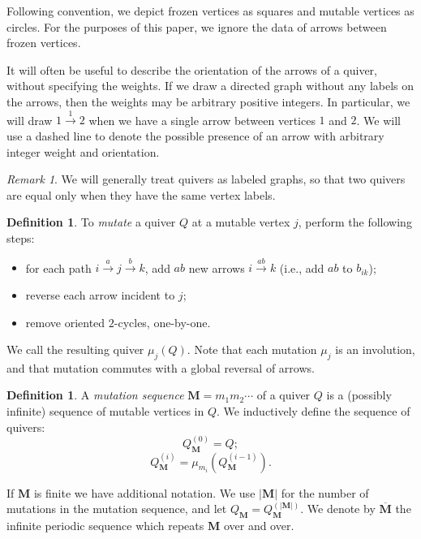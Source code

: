 \documentclass[12pt]{amsart}
\theoremstyle{definition}
\newtheorem{defn}[thm]{Definition}
\newtheorem{definition}[thm]{Definition}
\theoremstyle{remark}
\newtheorem{rem}[thm]{Remark}
\numberwithin{equation}{section}
\begin{document}
Following convention, we depict frozen vertices as squares and mutable vertices as circles.  For the purposes of this paper, we ignore the data of arrows between frozen vertices.

It will often be useful to describe the orientation of the arrows of a quiver, without specifying the weights.  If we draw a directed graph without any labels on the arrows, then the weights may be arbitrary positive integers.
In particular, we will draw $1 \stackrel{1}{\rightarrow} 2$ when we have a single arrow between vertices $1$ and $2$. 
We will use a dashed line to denote the possible presence of an arrow with arbitrary integer weight and orientation. 

\begin{rem}
We will generally treat quivers as labeled graphs, so that two quivers are equal only when they have the same vertex labels. 
\end{rem}

\pagebreak[2]

\begin{defn}
\label{def:mutation}
To \emph{mutate} a quiver $Q$ at a mutable vertex $j$, perform the following steps:
\begin{itemize}
\item for each path $i \stackrel{a}{\rightarrow} j \stackrel{b}{\rightarrow} k$, add $ab$ new arrows $i \stackrel{ab}{\rightarrow} k$ (i.e., add $ab$ to $b_{ik}$); 
\item reverse each arrow incident to $j$;
\item remove oriented $2$-cycles, one-by-one.
\end{itemize}
We call the resulting quiver $\mu_j(Q)$.
Note that each mutation $\mu_j$ is an involution, and that mutation commutes with a global reversal of arrows.
\end{defn}


\begin{definition}
\label{def:visit seq}
A \emph{mutation sequence} $\mathbf M = m_1 m_2 \cdots$ of a quiver $Q$ is a (possibly infinite) sequence of mutable vertices in $Q$.
We inductively define the sequence of quivers: 
\[Q_{\mathbf M}^{(0)} = Q;\]
\[Q_{\mathbf M}^{(i)} = \mu_{m_i}(Q_{\mathbf M}^{(i-1)}).\]

If $\mathbf M$ is finite we have additional notation.   We use $|\mathbf M|$ for the number of mutations in the mutation sequence, and let $Q_{\mathbf M} = Q_{\mathbf M}^{(|\mathbf M|)}$.  We denote by $\overline{\mathbf{M}}$ the infinite periodic sequence which repeats $\mathbf M$ over and over. 
\end{definition}
\end{document}
